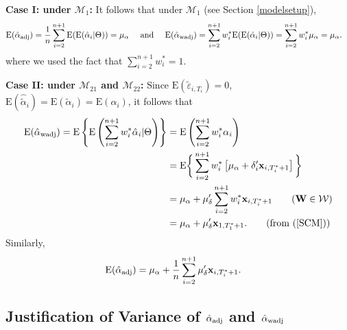 \documentclass[11pt]{article}
\def\mbf#1{\mathbf{#1}} %
\def\mrm#1{\mathrm{#1}} %
\def\mc#1{\mathcal{#1}} %
\def\E#1{\mathrm{E}(#1)} %
\theoremstyle{definition}
\begin{document}
\noindent \textbf{Case I: under $\mc{M}_{1}$:} It follows that  under $\mc{M}_{1}$ (see Section \ref{modelsetup}),
\begin{align*}
\E{\hat{\alpha}_{\rm adj}} =\frac{1}{n}  \sum_{i=2}^{n+1} \E{\E{\hat{\alpha}_i|\Theta}} = \mu_{\alpha} 
\quad \text{ and } \quad \E{\hat{\alpha}_{\rm wadj}}&= \sum_{i=2}^{n+1} w_i^* \E{\E{\hat{\alpha}_i|\Theta}}= \sum_{i=2}^{n+1} w_i^*\mu_{\alpha}= \mu_{\alpha}.
\end{align*}
where we used the fact that $\sum_{i=2}^{n+1} w^*_i=1$. 

\noindent \textbf{Case II: under $\mc{M}_{21}$ and $\mc{M}_{22}$:} Since $\E{\tilde{\varepsilon}_{i, T_i}}=0$, $\E{\hat{\tilde{\alpha}}_{i}}=\E{\tilde{\alpha}_{i}}=\E{\alpha_{i}}$, it follows that
  \begin{align*}
   \E{\hat{\alpha}_{\rm wadj}}= \mrm{E}\left\{\mrm{E}\left(\sum_{i=2}^{n+1} w_i^*\hat{\alpha}_i|\Theta\right)\right\}
   &= \mrm{E}\left( \sum_{i=2}^{n+1} w_i^*\alpha_i\right)\\
   &= \mrm{E}\bigg\{ \sum_{i=2}^{n+1} w_i^*\left[\mu_{\alpha}+\delta_{i}'\mbf{x}_{i, T_i^*+1}\right]\bigg\}\\
   &=\mu_{\alpha}+ \mu_{\delta}' \sum_{i=2}^{n+1} w_i^*\mbf{x}_{i, T_i^*+1}\tag{$\mbf{W}\in \mc{W}$}
   \\
   &=\mu_{\alpha}+  \mu_{\delta}'\mbf{x}_{1, T_1^*+1}. \tag{from (\ref{SCM})}
   \end{align*}
Similarly,
  \begin{align*}
   \E{\hat{\alpha}_{\rm adj}}
   &=\mu_{\alpha}+\frac{1}{n}\sum_{i=2}^{n+1} \mu_{\delta}'  \mbf{x}_{i, T_i^*+1}.
   \end{align*}


\subsection{Justification of Variance of $\hat{\alpha}_{\rm adj}$ and $\hat{\alpha}_{\rm wadj}$}
\label{var}
\end{document}
